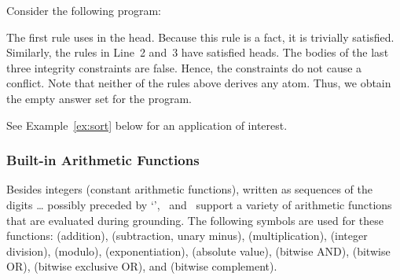 \begin{example}
Consider the following program:
%

The first rule uses  in the head.
Because this rule is a fact, it is trivially satisfied.
Similarly, the rules in Line~2 and~3 have satisfied heads.
The bodies of the last three integrity constraints are false.
Hence, the constraints do not cause a conflict.
Note that neither of the rules above derives any atom.
Thus, we obtain the empty answer set for the program.
\end{example}
See Example~\ref{ex:sort} below for an application of interest.
\subsubsection{Built-in Arithmetic Functions}\label{subsec:gringo:arith}

Besides integers (constant arithmetic functions),
written as sequences of the digits \dots{}
possibly preceded by `\code{-}',
\gringo\ and \clingo\ support a variety of arithmetic functions that
are evaluated during grounding.
The following symbols are used for these functions:
\code{+} (addition),
\code{-} (subtraction, unary minus),
\code{*} (multiplication),
\code{/} (integer division),
\code{\textbackslash} (modulo),
\code{**} (exponentiation),
\code{|$\cdot$|} (absolute value),
\code{\&} (bitwise AND),
 (bitwise OR),
\code{\^} (bitwise exclusive OR), and
\code{\textasciitilde} (bitwise complement).

